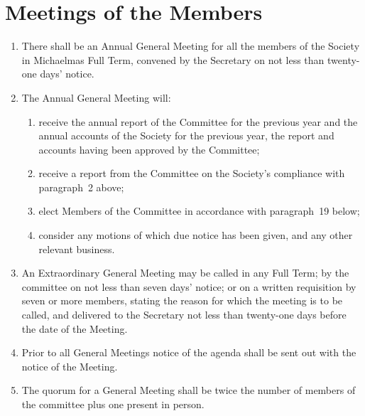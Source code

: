 \documentclass[11pt]{article}
\begin{document}
\section{Meetings of the Members}
\begin{enumerate}
\item There shall be an Annual General Meeting for all the members of the Society in Michaelmas Full Term, convened by the Secretary on not less than twenty-one days' notice.
\item The Annual General Meeting will:
\begin{enumerate}
\item receive the annual report of the Committee for the previous year and the annual accounts of the Society for the previous year, the report and accounts having been approved by the Committee;
\item receive a report from the Committee on the Society's compliance with paragraph~2 above;
\item elect Members of the Committee in accordance with paragraph~19 below;
\item consider any motions of which due notice has been given, and any other relevant business.
\end{enumerate}
\item An Extraordinary General Meeting may be called in any Full Term; by the committee on not less than seven days' notice; or on a written requisition by seven or more members, stating the reason for which the meeting is to be called, and delivered to the Secretary not less than twenty-one days before the date of the Meeting.
\item Prior to all General Meetings notice of the agenda shall be sent out with the notice of the Meeting.
\item The quorum for a General Meeting shall be twice the number of members of the committee plus one present in person. 
\end{enumerate}
\end{document}
